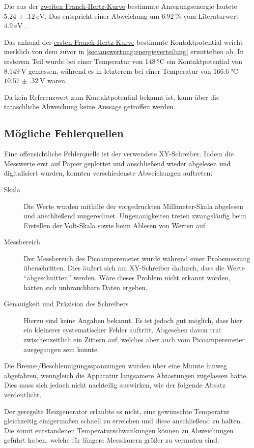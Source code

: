 Die aus der \hyperref[fig:franck_hertz_kurve_2]{zweiten Franck-Hertz-Kurve} bestimmte Anregungsenergie
lautete $\SI{5.24(12)}{\electronvolt}$.
Das entspricht einer Abweichung um $\SI{6.92}{\percent}$
vom Literaturwert $\SI{4.9}{\electronvolt}$ \cite{anregungsenergie}.

Das anhand der \hyperref[fig:franck_hertz_kurve_1]{ersten Franck-Hertz-Kurve} bestimmte Kontaktpotential
weicht merklich von dem zuvor in \autoref{sec:auswertung:energieverteilung} ermittelten ab.
In ersterem Teil wurde bei einer Temperatur von $\SI{148}{\celsius}$
ein Kontaktpotential von $\SI{8.149}{\volt}$ gemessen,
während es in letzterem
bei einer Temperatur von $\SI{166.6}{\celsius}$
$\SI{10.57(32)}{\volt}$ waren.

Da kein Referenzwert zum Kontaktpotential bekannt ist,
kann über die tatäschliche Abweichung keine Aussage getroffen werden.


\subsection{Mögliche Fehlerquellen}

Eine offensichtliche Fehlerquelle ist der verwendete XY-Schreiber.
Indem die Messwerte erst auf Papier geplottet
und anschließend wieder abgelesen und digitalisiert wurden,
konnten verschiedenste Abweichungen auftreten:

\begin{description}
  \item[Skala]
  Die Werte wurden mithilfe der vorgedruckten Millimeter-Skala abgelesen
  und anschließend umgerechnet.
  Ungenauigkeiten treten zwangsläufig beim Erstellen der Volt-Skala sowie beim Ablesen von Werten auf.

  \item[Messbereich]
  Der Messbereich des Picoamperemeter wurde während einer Probemessung überschritten.
  Dies äußert sich am XY-Schreiber dadurch,
  dass die Werte \enquote{abgeschnitten} werden.
  Wäre dieses Problem nicht erkannt worden,
  hätten sich unbrauchbare Daten ergeben.

  \item[Genauigkeit und Präzision des Schreibers]
  Hierzu sind keine Angaben bekannt.
  Es ist jedoch gut möglich,
  dass hier ein kleinerer systematischer Fehler auftritt.
  Abgesehen davon trat zwischenzeitlich ein Zittern auf,
  welches aber auch vom Picoamperemeter ausgegangen sein könnte.
\end{description}


Die Brems-/Beschleunigungsspannungen wurden über eine Minute hinweg abgefahren,
wenngleich die Apparatur langsamere Abtastungen zugelassen hätte.
Dies muss sich jedoch nicht nachteilig auswirken, wie der folgende Absatz verdeutlicht.


Der geregelte Heizgenerator erlaubte es nicht,
eine gewünschte Temperatur gleichzeitig einigermaßen schnell zu erreichen
und diese anschließend zu halten.
Die somit entstandenen Temperaturschwankungen können zu Abweichungen geführt haben,
welche für längere Messdauern größer zu vermuten sind.

